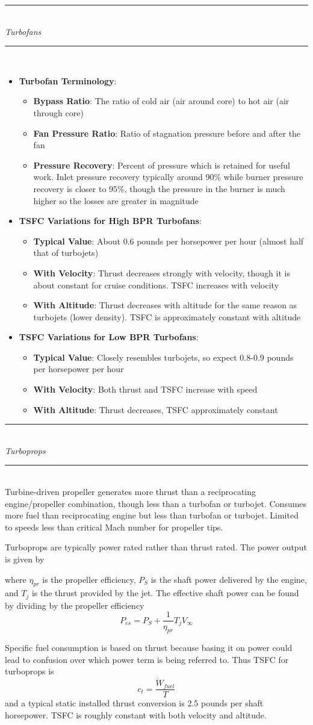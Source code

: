 \documentclass[11pt]{article}
\newcommand{\Item}[1]{\item \textbf{#1}:}
\newcommand{\Header}[1]{\noindent\rule{\textwidth}{0.4pt}\\[0.3cm]\indent \large{\textit{#1}}\normalsize{}\\[-0.1cm]\noindent\rule{\textwidth}{0.4pt}}
\newcommand{\CenteredBoxed}[1]{\begin{center}\boxed{#1}\end{center}}
\newcommand{\Vinfty}{V_\infty}
\begin{document}
\Header{Turbofans}\\
\begin{itemize}
\Item{Turbofan Terminology}
	\begin{itemize}
	\Item{Bypass Ratio} The ratio of cold air (air around core) to hot air (air through core)
	\Item{Fan Pressure Ratio} Ratio of stagnation pressure before and after the fan
	\Item{Pressure Recovery} Percent of pressure which is retained for useful work. Inlet pressure recovery typically around 90\% while burner pressure recovery is closer to 95\%, though the pressure in the burner is much higher so the losses are greater in magnitude
	\end{itemize}
\Item{TSFC Variations for High BPR Turbofans}
	\begin{itemize}
	\Item{Typical Value} About 0.6 pounds per horsepower per hour (almost half that of turbojets)
	\Item{With Velocity} Thrust decreases strongly with velocity, though it is about constant for cruise conditions. TSFC increases with velocity
	\Item{With Altitude} Thrust decreases with altitude for the same reason as turbojets (lower density). TSFC is approximately constant with altitude
	\end{itemize}
\Item{TSFC Variations for Low BPR Turbofans}
	\begin{itemize}
	\Item{Typical Value} Closely resembles turbojets, so expect 0.8-0.9 pounds per horsepower per hour
	\Item{With Velocity} Both thrust and TSFC increase with speed
	\Item{With Altitude} Thrust decreases, TSFC approximately constant
	\end{itemize}
\end{itemize}

\Header{Turboprops}\\

Turbine-driven propeller generates more thrust than a reciprocating engine/propeller combination, though less than a turbofan or turbojet. Consumes more fuel than reciprocating engine but less than turbofan or turbojet. Limited to speeds less than critical Mach number for propeller tips.

Turboprops are typically power rated rather than thrust rated. The power output is given by
\CenteredBoxed{P_A=\eta_{pr}P_S+T_j\Vinfty}
where $\eta_{pr}$ is the propeller efficiency, $P_S$ is the shaft power delivered by the engine, and $T_j$ is the thrust provided by the jet. The effective shaft power can be found by dividing by the propeller efficiency
$$P_{es}=P_S+\frac{1}{\eta_{pr}}T_j\Vinfty$$

Specific fuel consumption is based on thrust because basing it on power could lead to confusion over which power term is being referred to. Thus TSFC for turboprops is
$$c_t=\frac{\dot{W}_{fuel}}{T}$$
and a typical static installed thrust conversion is 2.5 pounds per shaft horsepower. TSFC is roughly constant with both velocity and altitude.
\end{document}
